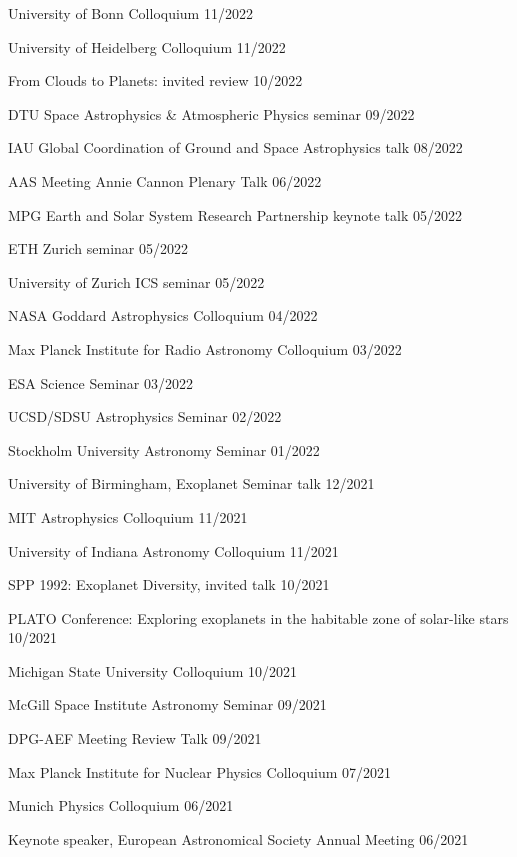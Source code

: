\documentclass[12pt,letterpaper]{article}
\begin{document}
\begin{list}{}{\cvlist}
\item {University of Bonn Colloquium \hfill 11/2022}
\item {University of Heidelberg Colloquium \hfill 11/2022}
\item {From Clouds to Planets: invited review \hfill 10/2022}
\item {DTU Space Astrophysics \& Atmospheric Physics seminar \hfill 09/2022}
\item {IAU Global Coordination of Ground and Space Astrophysics talk \hfill 08/2022}
\item {AAS Meeting Annie Cannon Plenary Talk \hfill 06/2022}
\item {MPG Earth and Solar System Research Partnership keynote talk \hfill 05/2022}
\item {ETH Zurich seminar \hfill 05/2022}
\item {University of Zurich ICS seminar \hfill 05/2022}
\item {NASA Goddard Astrophysics Colloquium \hfill 04/2022}
\item {Max Planck Institute for Radio Astronomy Colloquium \hfill 03/2022}
\item {ESA Science Seminar \hfill 03/2022}
\item {UCSD/SDSU Astrophysics Seminar \hfill 02/2022}
\item {Stockholm University Astronomy Seminar \hfill 01/2022}
\item {University of Birmingham, Exoplanet Seminar talk \hfill 12/2021}
\item {MIT Astrophysics Colloquium \hfill 11/2021}
\item {University of Indiana Astronomy Colloquium \hfill 11/2021}
\item {SPP 1992: Exoplanet Diversity, invited talk \hfill 10/2021}
\item {PLATO Conference: Exploring exoplanets in the habitable zone of solar-like stars \hfill 10/2021}
\item {Michigan State University Colloquium \hfill 10/2021}
\item {McGill Space Institute Astronomy Seminar \hfill 09/2021}
\item {DPG-AEF Meeting Review Talk \hfill  09/2021}
\item {Max Planck Institute for Nuclear Physics Colloquium \hfill 07/2021}
\item {Munich Physics Colloquium \hfill 06/2021}
\item {Keynote speaker, European Astronomical Society Annual Meeting \hfill 06/2021}

\end{list}
\end{document}

